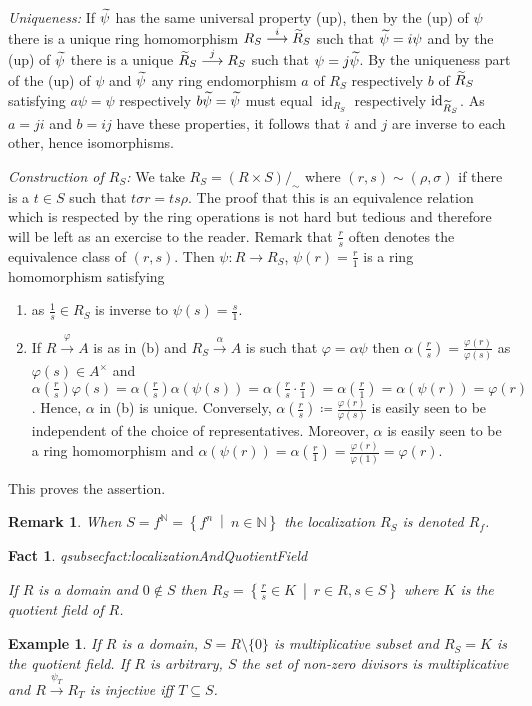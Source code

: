 \documentclass[DIV=14,parskip=full,pointednumbers]{scrartcl}
\renewcommand{\phi}{\varphi}
\newenvironment{alphanumerate}{\begin{enumerate}[label={$(\alph*)$},ref=\curthm]}{\end{enumerate}}
\theoremstyle{cthm}
\theoremstyle{cvarthm}
\renewenvironment{proof}[1][\proofname]
{\pushQED{\qed}\topsep0pt \partopsep0pt\trivlist\item[\hskip\labelsep\itshape #1.] }{\popQED\endtrivlist\addvspace{6pt plus 6pt}}
\theoremstyle{cdef}
\newtheorem{example}{Example}[subsection]
\newtheorem*{rem*}{Remark}
\newtheorem{fact}{Fact}[subsection]
\newcommand{\lbl}[1]{
	\label{#1}
	\ifmmode
	\expandafter\xdef\csname eqsubsec#1\endcsname{\thesubsection}
	\fi
}
\newcommand{\IN}{\mathbb{N}}
\newcommand{\id}{\operatorname{id}}
\newcommand{\longto}{\longrightarrow}
\newcommand{\snake}[1]{\widetilde{#1}\vphantom{\overrightarrow{#1}}}%
\newcommand{\morphism}[1][]{\overset{#1}{\longto}}
\newcommand{\st}{\ \middle|\ }
\renewcommand{\phi}{\varphi}
\begin{document}
	\begin{proof}
	\emph{Uniqueness:} 
		If $\snake \psi$ has the same universal property (up), then by the (up) of $\psi$ there is a unique ring homomorphism $R_S \morphism[i] \snake R_S$ such that $\snake\psi = i\psi$ and by the (up) of $\snake \psi$ there is a unique $\snake R_S\morphism[j] R_S$ such that $\psi = j\snake\psi$. By the uniqueness part of the (up) of $\psi$ and $\snake \psi$ any ring endomorphism $a$ of $R_S$ respectively $b$ of $\snake R_S$ satisfying $a\psi = \psi$ respectively $b\snake\psi = \snake\psi$ must equal $\id_{R_S}$ respectively $\id_{\snake R_S}$. As $a=ji$ and $b=ij$ have these properties, it follows that $i$ and $j$ are inverse to each other, hence isomorphisms.
		
	\emph{Construction of $R_S$:}
		We take $R_S = (R\times S)/_\sim$ where $(r,s) \sim (\rho,\sigma)$ if there is a $t\in S$ such that $t\sigma r = ts\rho$. The proof that this is an equivalence relation which is respected by the ring operations is not hard but tedious and therefore will be left as an exercise to the reader. Remark that $\frac{r}{s}$ often denotes the equivalence class of $(r,s)$. Then $\psi\colon R\to R_S$, $\psi(r) = \frac{r}{1}$ is a ring homomorphism satisfying
		\begin{alphanumerate}
		\item 
			as $\frac{1}{s}\in R_S$ is inverse to $\psi(s) = \frac{s}{1}$.
		\item 
			If $R\morphism[\phi] A$ is as in (b) and $R_S\morphism[\alpha] A$ is such that $\phi = \alpha \psi$ then $\alpha\left(\frac{r}{s}\right) = \frac{\phi(r)}{\phi(s)}$ as $\phi(s)\in A^\times$ and $\alpha\left(\frac rs\right) \phi(s) = \alpha\left(\frac{r}{s}\right) \alpha(\psi(s)) = \alpha\left(\frac{r}{s}\cdot\frac{r}{1}\right) = \alpha\left(\frac{r}{1}\right) = \alpha(\psi(r)) = \phi(r)$. Hence, $\alpha$ in (b) is unique. Conversely, $\alpha\left(\frac{r}{s}\right)\coloneqq \frac{\phi(r)}{\phi(s)}$ is easily seen to be independent of the choice of representatives. Moreover, $\alpha$ is easily seen to be a ring homomorphism and $\alpha(\psi(r)) = \alpha\left(\frac{r}{1}\right) = \frac{\phi(r)}{\phi(1)} = \phi(r)$.
		\end{alphanumerate}
		This proves the assertion.
	\end{proof}
	\begin{rem*}
		When $S=f^\IN = \left\{f^n\st n\in\IN\right\}$ the localization $R_S$ is denoted $R_f$.
	\end{rem*}
	\begin{fact}\lbl{fact:localizationAndQuotientField}
		If $R$ is a domain and $0\not\in S$ then $R_S=\left\{\frac{r}{s}\in K\st r\in R,s\in S\right\}$ where $K$ is the quotient field of $R$.
	\end{fact}
	\begin{example}
		If $R$ is a domain, $S=R\setminus\{0\}$ is multiplicative subset and $R_S = K$ is the quotient field. If $R$ is arbitrary, $S$ the set of non-zero divisors is multiplicative and $R\morphism[\psi_T] R_T$ is injective iff $T\subseteq S$.
	\end{example}
	
\end{document}
